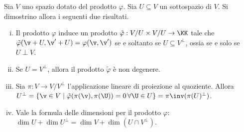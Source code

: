 \begin{exercise}
	Sia $V$ uno spazio dotato del prodotto $\varphi$. Sia
	$U \subseteq V$ un sottospazio di $V$. Si dimostrino allora i seguenti due
	risultati.
	
	\begin{enumerate}[(i)]
		\item Il prodotto $\varphi$
		induce un prodotto $\tilde \varphi : V/U \times V/U \to \KK$ tale che
		$\tilde \varphi(\v + U, \v' + U) = \varphi(\v, \v')$ se e soltanto se $U \subseteq V^\perp$, ossia
		se e solo se $U \perp V$.
		
		\item Se $U = V^\perp$, allora il prodotto $\tilde \varphi$ è non degenere.
		
		\item Sia $\pi : V \to V/V^\perp$ l'applicazione lineare di proiezione al quoziente. Allora
		$U^\perp = \{ \v \in V \mid \tilde \varphi(\pi(\v), \pi(\U)) = 0 \, \forall \U \in U \} = \pi\inv(\pi(U)^\perp)$.
		
		\item Vale la formula delle dimensioni per il prodotto $\varphi$: $\dim U + \dim U^\perp = \dim V + \dim (U \cap V^\perp)$.   
	\end{enumerate}
\end{exercise}

